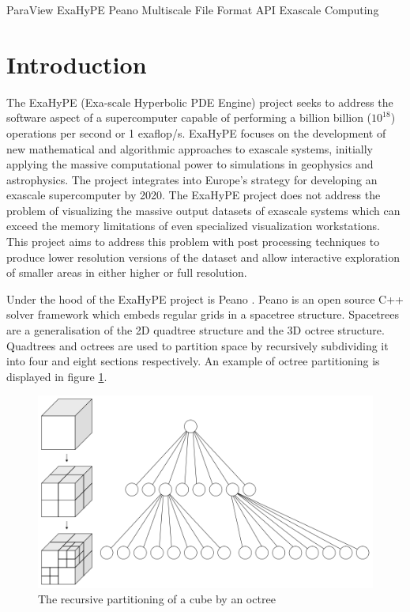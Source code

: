 \documentclass[12pt,a4paper]{article}
\begin{document}
\begin{keywords}
ParaView ExaHyPE Peano Multiscale File Format API Exascale Computing
\end{keywords}

\pagebreak
\section{Introduction}

The ExaHyPE (Exa-scale Hyperbolic PDE Engine) project \cite{exahype} seeks to address the software aspect of a supercomputer capable of performing a billion billion ($10^{18}$) operations per second or 1 exaflop/s. ExaHyPE focuses on the development of new mathematical and algorithmic approaches to exascale systems, initially applying the massive computational power to simulations in geophysics and astrophysics. The project integrates into Europe's strategy for developing an exascale supercomputer by 2020. The ExaHyPE project does not address the problem of visualizing the massive output datasets of exascale systems which can exceed the memory limitations of even specialized visualization workstations. This project aims to address this problem with post processing techniques to produce lower resolution versions of the dataset and allow interactive exploration of smaller areas in either higher or full resolution.

Under the hood of the ExaHyPE project is Peano \cite{Peano}. Peano is an open source C++ solver framework which embeds regular grids in a spacetree structure. Spacetrees are a generalisation of the 2D quadtree structure and the 3D octree structure. Quadtrees and octrees are used to partition space by recursively subdividing it into four and eight sections respectively. An example of octree partitioning is displayed in figure \ref{spacetree}.


\begin{figure}[h]
\centering
\includegraphics[scale=0.3]{1000px-Octree2}
\caption{The recursive partitioning of a cube by an octree}
\label{spacetree}
\end{figure}
\end{document}
